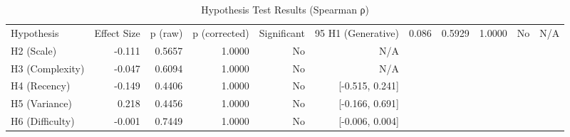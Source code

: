 \begin{table}
\caption{Hypothesis Test Results (Spearman ρ)}
\label{tab:results_spearman}
\begin{tabular}{lrrrrr}
\toprule
Hypothesis & Effect Size & p (raw) & p (corrected) & Significant & 95%
\midrule
H1 (Generative) & 0.086 & 0.5929 & 1.0000 & No & N/A \\
H2 (Scale) & -0.111 & 0.5657 & 1.0000 & No & N/A \\
H3 (Complexity) & -0.047 & 0.6094 & 1.0000 & No & N/A \\
H4 (Recency) & -0.149 & 0.4406 & 1.0000 & No & [-0.515, 0.241] \\
H5 (Variance) & 0.218 & 0.4456 & 1.0000 & No & [-0.166, 0.691] \\
H6 (Difficulty) & -0.001 & 0.7449 & 1.0000 & No & [-0.006, 0.004] \\
\bottomrule
\end{tabular}
\end{table}
